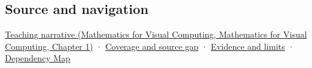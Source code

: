\subsection{Source and navigation}\label{appendix-f77eadcc4a93-source-and-navigation}

\href{../02-Mathematics-for-Visual-Computing/main.pdf\#nameddest=01-foundations-i-ch017-rotation-first-becomes-understandable-in-a-plane}{Teaching narrative (Mathematics for Visual Computing, Mathematics for Visual Computing, Chapter 1)} · \hyperref[appendix-fd090d982a15-phase-6---parts-501-600]{Coverage and source gap} · \hyperref[appendix-a103e7846d21-phase-6---source-analysis-and-verification]{Evidence and limits} · \hyperref[appendix-4ad47bdd269a]{Dependency Map}
